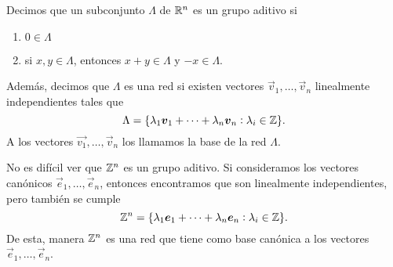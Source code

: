 \begin{definition}
	Decimos que un subconjunto $\Lambda$ de $\mathbb{R}^n$ es un grupo aditivo si
	\begin{enumerate}
		\item $0 \in \Lambda$
		\item si $x, y \in \Lambda$, entonces $x + y \in \Lambda$ y $-x \in \Lambda$.
	\end{enumerate}
	Además, decimos que $\Lambda$ es una red si existen vectores $\vec{v}_1, \ldots, \vec{v}_n$
	linealmente independientes tales que
	\begin{equation*}
		\Lambda = \lbrace \lambda_1\boldsymbol{v}_1 + \cdots + \lambda_n\boldsymbol{v}_n \vcentcolon \lambda_i \in
		\mathbb{Z} \rbrace.
	\end{equation*}
	A los vectores $\vec{v_1}, \ldots, \vec{v}_n$ los llamamos la base de la red $\Lambda$.
\end{definition}

\begin{example}
	No es difícil ver que $\mathbb{Z}^n$ es un grupo aditivo. Si consideramos los vectores canónicos
	$\vec{e}_1, \ldots, \vec{e}_n$, entonces encontramos que son linealmente independientes, pero
	también se cumple
	\begin{equation*}
		\mathbb{Z}^n = \lbrace \lambda_1\boldsymbol{e}_1 + \cdots + \lambda_n\boldsymbol{e}_n \vcentcolon \lambda_i \in
		\mathbb{Z} \rbrace.
	\end{equation*}
	De esta, manera $\mathbb{Z}^n$ es una red que tiene como base canónica a los vectores $\vec{e}_1,
	\ldots, \vec{e}_n$.
\end{example}


